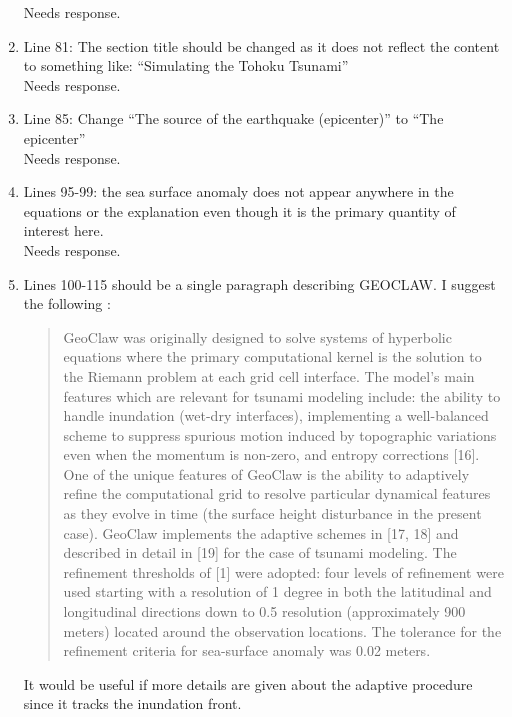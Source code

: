 \documentclass[]{article}
\newcommand{\alert}[1]{{\color{red} #1}}
\begin{document}
\begin{enumerate}
\alert{Needs response.} \\

\item Line 81: The section title should be changed as it does not reflect the content to something like:  “Simulating the Tohoku Tsunami” \\

\alert{Needs response.} \\

\item Line 85: Change “The source of the earthquake (epicenter)” to “The epicenter” \\

\alert{Needs response.} \\

\item Lines 95-99: the sea surface anomaly does not appear anywhere in the equations or the explanation even though it is the primary quantity of interest here. \\

\alert{Needs response.} \\

\item Lines 100-115 should be a single paragraph describing GEOCLAW. I suggest the following :
\begin{quote}
GeoClaw was originally designed to solve systems of hyperbolic equations where the primary computational kernel is the solution to the Riemann problem at each grid cell interface. The model’s main features which are relevant for tsunami modeling include: the ability to handle inundation (wet-dry interfaces), implementing a well-balanced scheme to suppress spurious motion induced by topographic variations even when the momentum is non-zero, and entropy corrections [16]. One of the unique features of GeoClaw is the ability to adaptively refine the computational grid to resolve particular dynamical features as they evolve in time (the surface height disturbance in the present case). GeoClaw implements the adaptive schemes in [17, 18] and described in detail in [19] for the case of tsunami modeling. The refinement thresholds of [1] were adopted: four levels of refinement were used starting with a resolution of 1 degree in both the latitudinal and longitudinal directions down to 0.5 resolution (approximately 900 meters) located around the observation locations. The tolerance for the refinement criteria for sea-surface anomaly was 0.02 meters.  
\end{quote}
It would be useful if more details are given about the adaptive procedure since it tracks the inundation front. \\


\end{enumerate}
\end{document}
